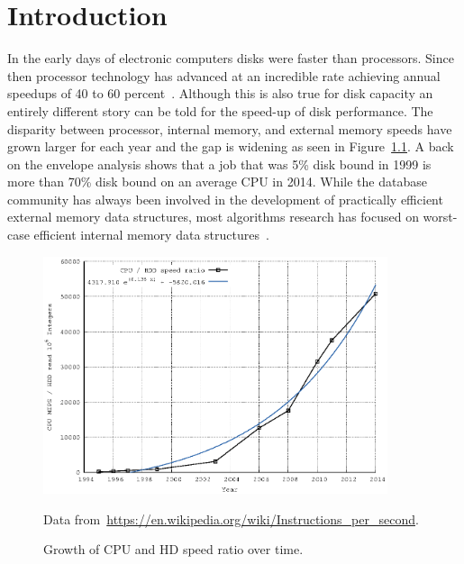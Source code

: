 \documentclass[twoside,11pt,openright]{report}
\begin{document}
\chapter{Introduction}
\label{chp:introduction}
\setcounter{secnumdepth}{2}


In the early days of electronic computers disks were faster than processors. Since then processor technology has advanced at an incredible rate achieving annual speedups of 40 to 60 percent~\cite{ruemmler_wilkes_1994}. Although this is also true for disk capacity an entirely different story can be told for the speed-up of disk performance. The disparity between processor, internal memory, and external memory speeds have grown larger for each year and the gap is widening as seen in Figure~\ref{fig:cpu_vs_disk}. A back on the envelope analysis shows that a job that was 5\% disk bound in 1999 is more than 70\% disk bound on an average CPU in 2014. While the database community has always been involved in the development of practically efficient external memory data structures, most algorithms research has focused on worst-case efficient internal memory data structures~\cite{ionote}. 

\begin{figure}[h]
	\centering
		\includegraphics[width=0.9\textwidth]{../plots/scaling_discrepancy_hdd_cpu/scaling_discrepancy_hdd_cpu}
	\caption{Growth of CPU and HD speed ratio over time.}
	\tiny{Data from~\protect\url{https://en.wikipedia.org/wiki/Instructions_per_second}.}
	\label{fig:cpu_vs_disk}
\end{figure}
\end{document}
